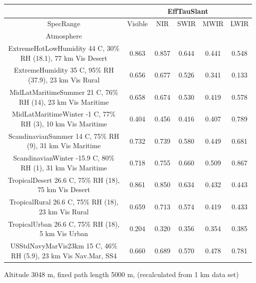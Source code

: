 \documentclass{workpackage}
\begin{document}
\begin{center}

\begin{footnotesize}

\begin{tabular}{|c|c|c|c|c|c|}
\hline
&\multicolumn{5}{|c|}{EffTauSlant}\\\hline
SpecRange&Visible&NIR&SWIR&MWIR&LWIR\\\hline
Atmosphere&&&&&\\\hline
ExtremeHotLowHumidity 44 C, 30\% RH (18.1), 77 km Vis Desert&0.863&0.857&0.644&0.441&0.548\\\hline
ExtremeHumidity 35 C, 95\% RH (37.9), 23 km Vis Rural&0.656&0.677&0.526&0.341&0.133\\\hline
MidLatMaritimeSummer 21 C, 76\% RH (14), 23 km Vis Maritime&0.658&0.674&0.530&0.419&0.578\\\hline
MidLatMaritimeWinter -1 C, 77\% RH (3), 10 km Vis Maritime&0.404&0.456&0.416&0.407&0.789\\\hline
ScandinavianSummer 14 C, 75\% RH (9), 31 km Vis Maritime&0.732&0.739&0.580&0.449&0.681\\\hline
ScandinavianWinter -15.9 C, 80\% RH (1), 31 km Vis Maritime&0.718&0.755&0.660&0.509&0.867\\\hline
TropicalDesert 26.6 C, 75\% RH (18), 75 km Vis Desert&0.861&0.850&0.634&0.432&0.443\\\hline
TropicalRural 26.6 C, 75\% RH (18), 23 km Vis Rural&0.659&0.713&0.574&0.419&0.433\\\hline
TropicalUrban 26.6 C, 75\% RH (18), 5 km Vis Urban&0.204&0.320&0.356&0.354&0.385\\\hline
USStdNavyMarVis23km 15 C, 46\% RH (5.9), 23 km Vis Nav.Mar, SS4&0.660&0.689&0.570&0.478&0.781\\\hline

\end{tabular}
\end{footnotesize}
\end{center}

Altitude 3048 m, fixed path length 5000 m, (recalculated from 1 km data set)
\end{document}

